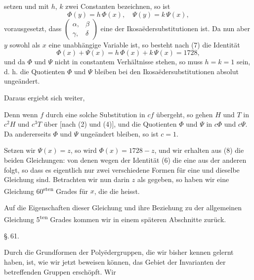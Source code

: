 setzen und mit $h$, $k$ zwei Constanten bezeichnen, so ist
\[
\Phi(y) = h\,\Phi(x), \quad \Psi(y) = k\,\Psi(x),
\]
vorausgesetzt, dass $\begin{pmatrix} \alpha, & \beta \\ \gamma, & \delta \end{pmatrix}$ eine der Ikosa\"edersubstitutionen ist. Da nun aber $y$ sowohl als $x$ eine unabhängige Variable ist, so besteht nach (7) die Identität
\[
\Phi(x) + \Psi(x) = h\,\Phi(x) + k\,\Psi(x) = 1728,
\]
und da $\Phi$ und $\Psi$ nicht in constantem Verhältnisse stehen, so muss $h = k = 1$ sein, d. h. die Quotienten $\Phi$ und $\Psi$ bleiben bei den Ikosa\"edersubstitutionen absolut ungeändert.

Daraus ergiebt sich weiter, 

Denn wenn $f$ durch eine solche Substitution in $cf$ übergeht, so gehen $H$ und $T$ in $c^2H$ und $c^3T$ über [nach (2) und (4)], und die Quotienten $\Phi$ und $\Psi$ in $c\Phi$ und $c\Psi$. Da andererseits $\Phi$ und $\Psi$ ungeändert bleiben, so ist $c = 1$.

Setzen wir $\Psi(x) = z$, so wird $\Phi(x) = 1728 - z$, und wir erhalten aus (8) die beiden Gleichungen:
von denen wegen der Identität (6) die eine aus der anderen folgt, so dass es eigentlich nur zwei verschiedene Formen für eine und dieselbe Gleichung sind. Betrachten wir nun darin $z$ als gegeben, so haben wir eine Gleichung 60\textsuperscript{sten} Grades für $x$, die die  heisst.

Auf die Eigenschaften dieser Gleichung und ihre Beziehung zu der allgemeinen Gleichung 5\textsuperscript{ten} Grades kommen wir in einem späteren Abschnitte zurück.

\begin{center}
\S.\,61.\\[2pt]
\end{center}

Durch die Grundformen der Poly\"edergruppen, die wir bisher kennen gelernt haben, ist, wie wir jetzt beweisen können, das Gebiet der Invarianten der betreffenden Gruppen erschöpft. Wir
